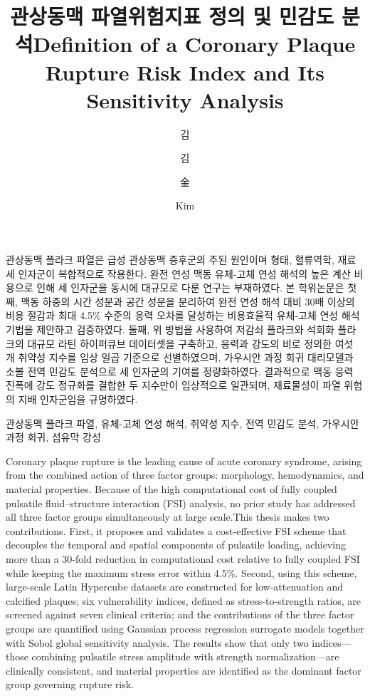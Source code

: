 \documentclass[master,english,final]{kaist-ucs}
\title[korean] {관상동맥 파열위험지표 정의 및 민감도 분석}
\title[english]{Definition of a Coronary Plaque Rupture Risk Index and Its Sensitivity Analysis}
\author[korean]{김}{세 혁}
\author[korean2]{김}{세혁}
\author[chinese]{金}{世 赫}
\author[english]{Kim}{Sehyeog}
\begin{document}
\thesisinfo

\begin{summary}
관상동맥 플라크 파열은 급성 관상동맥 증후군의 주된 원인이며 형태, 혈류역학, 재료 세 인자군이 복합적으로 작용한다. 
완전 연성 맥동 유체-고체 연성 해석의 높은 계산 비용으로 인해 세 인자군을 동시에 대규모로 다룬 연구는 부재하였다. 
본 학위논문은 첫째, 맥동 하중의 시간 성분과 공간 성분을 분리하여 완전 연성 해석 대비 30배 이상의 비용 절감과 최대 4.5\% 수준의 
응력 오차를 달성하는 비용효율적 유체-고체 연성 해석 기법을 제안하고 검증하였다.
둘째, 위 방법을 사용하여 저감쇠 플라크와 석회화 플라크의 대규모 라틴 하이퍼큐브 데이터셋을 구축하고, 
응력과 강도의 비로 정의한 여섯 개 취약성 지수를 임상 일곱 기준으로 선별하였으며, 가우시안 과정 회귀 대리모델과 소볼 전역 민감도 분석으로 세 인자군의 기여를 정량화하였다. 
결과적으로 맥동 응력 진폭에 강도 정규화를 결합한 두 지수만이 임상적으로 일관되며, 재료물성이 파열 위험의 지배 인자군임을 규명하였다.
\end{summary}

\begin{Korkeyword}
관상동맥 플라크 파열, 유체-고체 연성 해석, 취약성 지수, 전역 민감도 분석, 가우시안 과정 회귀, 섬유막 강성
\end{Korkeyword}

\begin{abstract}


\end{abstract}

\begin{Engkeyword}
Coronary plaque rupture is the leading cause of acute coronary syndrome, arising from the combined action of three factor groups: morphology, hemodynamics, and material properties. Because of the high computational cost of fully coupled pulsatile fluid–structure interaction (FSI) analysis, no prior study has addressed all three factor groups simultaneously at large scale.This thesis makes two contributions. First, it proposes and validates a cost-effective FSI scheme that decouples the temporal and spatial components of pulsatile loading, achieving more than a 30-fold reduction in computational cost relative to fully coupled FSI while keeping the maximum stress error within 4.5\%. 
Second, using this scheme, large-scale Latin Hypercube datasets are constructed for low-attenuation and calcified plaques; six vulnerability indices, defined as stress-to-strength ratios, are screened against seven clinical criteria; and the contributions of the three factor groups are quantified using Gaussian process regression surrogate models together with Sobol global sensitivity analysis. The results show that only two indices—those combining pulsatile stress amplitude with strength normalization—are clinically consistent, and material properties are identified as the dominant factor group governing rupture risk.\end{Engkeyword}
\end{document}
